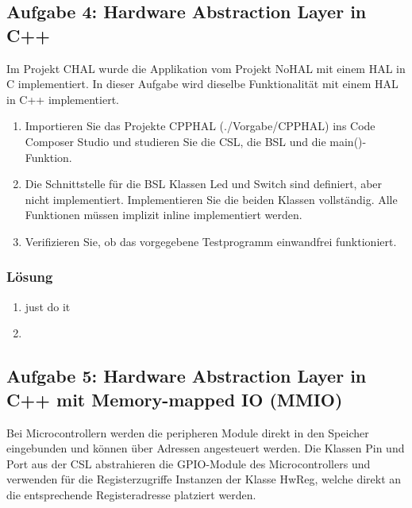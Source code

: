 \subsection{Aufgabe 4: Hardware Abstraction Layer in C++}
Im Projekt CHAL wurde die Applikation vom Projekt NoHAL mit einem HAL in C implementiert. In dieser Aufgabe
wird dieselbe Funktionalität mit einem HAL in C++ implementiert.

\begin{enumerate}
  \item  Importieren Sie das Projekte CPPHAL (./Vorgabe/CPPHAL) ins Code Composer Studio und studieren Sie
die CSL, die BSL und die main()-Funktion.
\item  Die Schnittstelle für die BSL Klassen Led und Switch sind definiert, aber nicht implementiert. Implementieren
Sie die beiden Klassen vollständig. Alle Funktionen müssen implizit inline implementiert werden.
\item Verifizieren Sie, ob das vorgegebene Testprogramm einwandfrei funktioniert.
\end{enumerate}

\subsubsection{Lösung}


\begin{enumerate}
  \item just do it
  \item 
  \noindent\makebox[\linewidth]{\rule{\paperwidth}{0.4pt}}
  
  \noindent\makebox[\linewidth]{\rule{\paperwidth}{0.4pt}}
\end{enumerate}

\subsection{Aufgabe 5: Hardware Abstraction Layer in C++ mit Memory-mapped IO (MMIO)}

Bei Microcontrollern werden die peripheren Module direkt in den Speicher eingebunden und können über
Adressen angesteuert werden. Die Klassen Pin und Port aus der CSL abstrahieren die GPIO-Module des
Microcontrollers und verwenden für die Registerzugriffe Instanzen der Klasse HwReg, welche direkt an die
entsprechende Registeradresse platziert werden.


